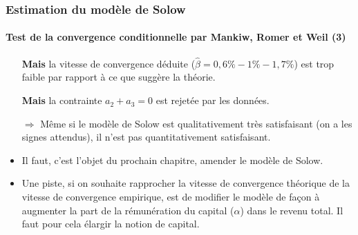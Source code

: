 \documentclass[10pt,notheorems]{beamer}
\theoremstyle{plain}
\theoremstyle{definition} %
\begin{document}
\begin{frame}
  \frametitle{Estimation du modèle de Solow}
  \framesubtitle{Test de la convergence conditionnelle par Mankiw, Romer et Weil (3)}

  \begin{itemize}

  \item[\manerrarrow] \textbf{Mais} la vitesse de convergence déduite ($\hat \beta = 0,6\% - 1\% - 1,7\%$) est trop faible par rapport à ce que suggère la théorie.\newline

  \item[\manerrarrow] \textbf{Mais} la contrainte $a_2+a_3=0$ est rejetée par les données.\newline

  \item[$\Rightarrow$] Même si le modèle de Solow est qualitativement très satisfaisant (on a les signes attendus), il n'est pas quantitativement satisfaisant.\newline

  \item Il faut, c'est l'objet du prochain chapitre, amender le modèle de Solow.\newline

  \item Une piste, si on souhaite rapprocher la vitesse de convergence théorique de la vitesse de convergence empirique, est de modifier le modèle de façon à augmenter la part de la rémunération du capital ($\alpha$) dans le revenu total. Il faut pour cela élargir la notion de capital.

  \end{itemize}

\end{frame}
\end{document}
